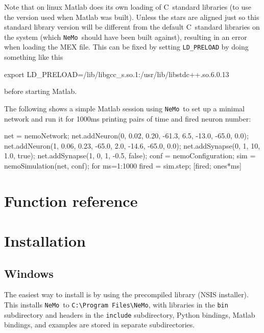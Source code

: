 \documentclass[a4paper]{article}
\newcommand{\nemo}{\texttt{NeMo}}
\newcommand{\code}[1]{\texttt{#1}}
\newcommand{\directory}[1]{\texttt{#1}}
\newcommand{\cpp}{C\nolinebreak\hspace{-.05em}\raisebox{.4ex}{\tiny\bf +}\nolinebreak\hspace{-.10em}\raisebox{.4ex}{\tiny\bf +}}
\begin{document}
Note that on linux Matlab does its own loading of \cpp\ standard libraries
	(to use the version used when Matlab was built).
Unless the stars are aligned just so this standard library version will be
different from the default \cpp\ standard libraries on the system (which \nemo\ should have been built against), resulting in an error when loading the MEX file.
This can be fixed by setting \code{LD\_PRELOAD} by doing something like this

\begin{shell}
export LD_PRELOAD=/lib/libgcc_s.so.1:/usr/lib/libstdc++.so.6.0.13
\end{shell}

before starting Matlab.

The following shows a simple Matlab session using \nemo\ to set up a minimal
network and run it for 1000ms printing pairs of time and fired neuron number:

\begin{matlab}
net = nemoNetwork;
net.addNeuron(0, 0.02, 0.20, -61.3, 6.5, -13.0, -65.0, 0.0);
net.addNeuron(1, 0.06, 0.23, -65.0, 2.0, -14.6, -65.0, 0.0);
net.addSynapse(0, 1, 10, 1.0, true);
net.addSynapse(1, 0, 1, -0.5, false);
conf = nemoConfiguration;
sim = nemoSimulation(net, conf);
for ms=1:1000 
	fired = sim.step;
	[fired; ones*ms]
\end{matlab}


\newpage
\section{Function reference}
\label{fnref}



\section{Installation}

\subsection{Windows}
\label{installation:windows}

The easiest way to install is by using the precompiled library (NSIS installer).
This installs \nemo\ to \directory{C:\textbackslash Program Files\textbackslash NeMo},
	with
		libraries in the \directory{bin} subdirectory and
		headers in the \directory{include} subdirectory,
Python bindings, Matlab bindings, and examples are stored in separate subdirectories.
\end{document}
